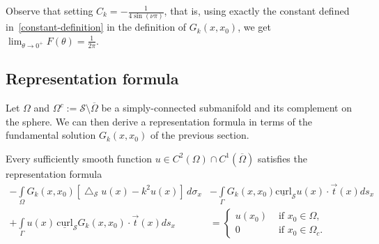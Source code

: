 \documentclass[final]{siamltex}
\newcommand{\lap}{\bigtriangleup}
\newcommand{\C}{C_k}
\renewcommand{\S} {\mathcal{S}}
\begin{document}
Observe that setting $\C=-\frac{1}{4\sin(\nu \pi)}$, that is, using
exactly the constant defined in~\eqref{constant-definition} in the
definition of $G_k(x,x_0)$, we  get $\lim_{\theta\rightarrow
0^+}F(\theta)=\frac{1}{2\pi}.$




\subsection{Representation formula}
\label{s:representation}
Let $\Omega$ and $\Omega^{c}:=\S\setminus{\overline{\Omega}}$ be a
simply-connected submanifold and its complement on the sphere. We can
then derive a representation formula in terms of the fundamental
solution
$G_k(x,x_{0})$ of the previous section.
\begin{proposition}
\label{prop:repr}
Every sufficiently smooth function $u \in C^{2}(\Omega) \cap
C^{1}(\overline{\Omega})$ satisfies the representation formula
\begin{align} 
\label{eq:representationformula}
 - \int\limits_{\Omega} 
    G_k(x,x_{0})\left[\lap_{\S}u(x) -k^2 u(x)\right]\,d\sigma_x 
 &- \int\limits_{{\Gamma}} G_k(x,x_{0})  
    \underline{\mbox{curl}}_{\S} u(x) \cdot \vec{t}(x) ds_x \nonumber \\
 + \int\limits_{{\Gamma}}  u(x)
 \,\underline{\mbox{curl}}_{{\S}} G_k(x,x_0) \cdot \vec{t}(x) ds_x 
 &= \left\{ \begin{array}{ll} u(x_0) & \mbox{ if $x_0\in \Omega$},\\
  0 & \mbox{ if  $x_0\in{\Omega}_c$}. 
  \end{array} \right.
\end{align}

\end{proposition}
\end{document}
